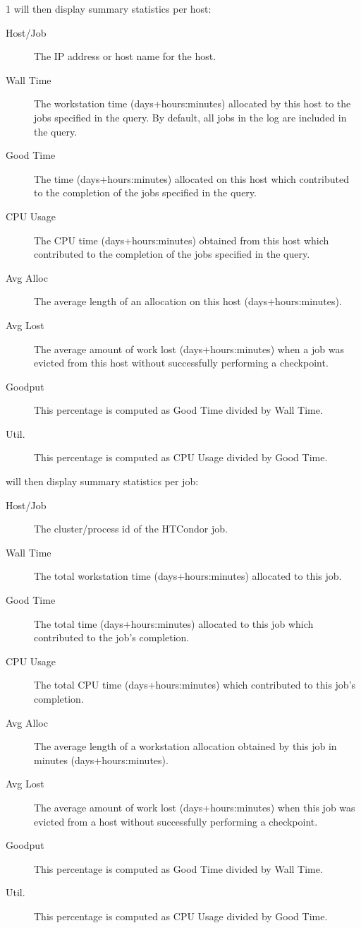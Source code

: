 \begin{ManPage}{\label{man-condor-userlog}}{1}
 will then display summary statistics per host:

\begin{description}
\item[Host/Job] The IP address or host name for the host.
\item[Wall Time] The workstation time (days+hours:minutes) allocated by
this host to the jobs specified in the query.  By default, all jobs in
the log are included in the query.
\item[Good Time] The time (days+hours:minutes) allocated on this host which
contributed to the completion of the jobs specified in the query.
\item[CPU Usage] The CPU time (days+hours:minutes) obtained from this
host which
contributed to the completion of the jobs specified in the query.
\item[Avg Alloc] The average length of an allocation on this host
(days+hours:minutes).
\item[Avg Lost] The average amount of work lost (days+hours:minutes) when a job
was evicted from this host without successfully performing a checkpoint.
\item[Goodput] This percentage is computed as Good Time divided by
Wall Time.
\item[Util.] This percentage is computed as CPU Usage divided by Good
Time.
\end{description}

 will then display summary statistics per job:

\begin{description}
\item[Host/Job] The cluster/process id of the HTCondor job.
\item[Wall Time] The total workstation time (days+hours:minutes) allocated to
this job.
\item[Good Time] The total time (days+hours:minutes) allocated to this
job which 
contributed to the job's completion.
\item[CPU Usage] The total CPU time (days+hours:minutes) which
contributed to this 
job's completion.
\item[Avg Alloc] The average length of a workstation allocation
obtained by this job in minutes (days+hours:minutes).
\item[Avg Lost] The average amount of work lost (days+hours:minutes)
when this job 
was evicted from a host without successfully performing a checkpoint.
\item[Goodput] This percentage is computed as Good Time divided by
Wall Time.
\item[Util.] This percentage is computed as CPU Usage divided by Good
Time.
\end{description}


\end{ManPage}
